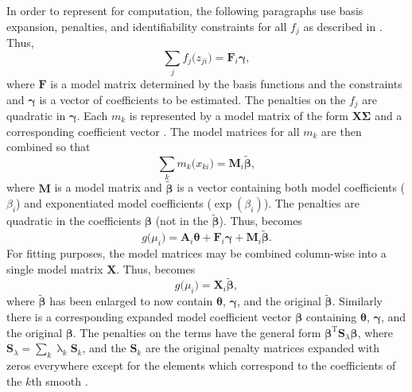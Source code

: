 In order to represent  for computation, the following paragraphs use basis expansion, penalties, and identifiability constraints for all \(f_j\) as described in \textcite{Wood2006}.  Thus, 
\begin{equation}
  \label{eq:SCAMCombinedModelMatricesfk}
  \sum_j f_j\bigl(z_{j i}\bigr) = \symbf{F}_i \symbf{\gamma},
\end{equation}
where \(\symbf{F}\) is a model matrix determined by the basis functions and the constraints and \(\symbf{\gamma}\) is a vector of coefficients to be estimated.  The penalties on the \(f_j\) are quadratic in \(\symbf{\gamma}\).  Each \(m_k\) is represented by a model matrix of the form \(\symbf{X} \symbf{\Sigma}\) and a corresponding coefficient vector \parencite{Pya2015}.  The model matrices for all \(m_k\) are then combined so that
\begin{equation}
  \label{eq:SCAMCombinedModelMatricesMk}
  \sum_k m_k\bigl(x_{k i}\bigr) = \symbf{M}_i \tilde{\symbf{\beta}},
\end{equation}
where \(\symbf{M}\) is a model matrix and \(\tilde{\symbf{\beta}}\) is a vector containing both model coefficients (\(\beta_i\)) and exponentiated model coefficients (\(\exp(\beta_i)\)).  The penalties are quadratic in the coefficients \(\symbf{\beta}\) (not in the \(\tilde{\symbf{\beta}}\)).  Thus,  becomes
\begin{equation}
  \label{eq:SCAMComputationalRepresentation01}
  g\bigl(\mu_i\bigr) = \symbf{A}_i \symbf{\theta} + \symbf{F}_i \symbf{\gamma} + \symbf{M}_i \tilde{\symbf{\beta}}.
\end{equation}
For fitting purposes, the model matrices may be combined column-wise into a single model matrix \(\symbf{X}\). Thus,  becomes
\begin{equation}
  \label{eq:SCAMComputationalRepresentation02}
  g\bigl(\mu_i\bigr) = \symbf{X}_i \tilde{\symbf{\beta}},
\end{equation}
where \(\tilde{\symbf{\beta}}\) has been enlarged to now contain \(\symbf{\theta}\), \(\symbf{\gamma}\), and the original \(\tilde{\symbf{\beta}}\).  Similarly there is a corresponding expanded model coefficient vector \(\symbf{\beta}\) containing \(\symbf{\theta}\), \(\symbf{\gamma}\), and the original \(\symbf{\beta}\).  The penalties on the terms have the general form \(\symbf{\beta}^{\text{T}} \symbf{S}_\lambda \symbf{\beta}\), where \(\symbf{S}_\lambda = \sum_k \uplambda_k \symbf{S}_k\), and the \(\symbf{S}_k\) are the original penalty matrices expanded with zeros everywhere except for the elements which correspond to the coefficients of the \(k\)th smooth \parencite{Pya2015}.

